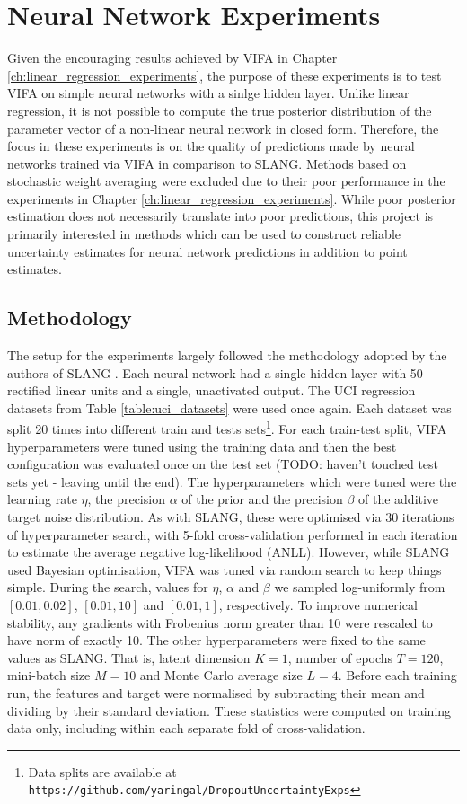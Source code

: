 \documentclass[msc,deptreport.inf]{infthesis} %
\begin{document}
\chapter{Neural Network Experiments}

Given the encouraging results achieved by VIFA in Chapter \ref{ch:linear_regression_experiments}, the purpose of these experiments is to test VIFA on simple neural networks with a sinlge hidden layer. Unlike linear regression, it is not possible to compute the true posterior distribution of the parameter vector of a non-linear neural network in closed form. Therefore, the focus in these experiments is on the quality of predictions made by neural networks trained via VIFA in comparison to SLANG. Methods based on stochastic weight averaging were excluded due to their poor performance in the experiments in Chapter \ref{ch:linear_regression_experiments}. While poor posterior estimation does not necessarily translate into poor predictions, this project is primarily interested in methods which can be used to construct reliable uncertainty estimates for neural network predictions in addition to point estimates. 

\section{Methodology}

The setup for the experiments largely followed the methodology adopted by the authors of SLANG \cite{mishkin2018}. Each neural network had a single hidden layer with 50 rectified linear units and a single, unactivated output. The UCI regression datasets from Table \ref{table:uci_datasets} were used once again. Each dataset was split 20 times into different train and tests sets\footnote{Data splits are available at \texttt{https://github.com/yaringal/DropoutUncertaintyExps}}. For each train-test split, VIFA hyperparameters were tuned using the training data and then the best configuration was evaluated once on the test set (TODO: haven't touched test sets yet - leaving until the end). The hyperparameters which were tuned were the learning rate $\eta$, the precision $\alpha$ of the prior and the precision $\beta$ of the additive target noise distribution. As with SLANG, these were optimised via 30 iterations of hyperparameter search, with 5-fold cross-validation performed in each iteration to estimate the average negative log-likelihood (ANLL). However, while SLANG used Bayesian optimisation, VIFA was tuned via random search to keep things simple. During the search, values for $\eta$, $\alpha$ and $\beta$ we sampled log-uniformly from $[0.01, 0.02]$, $[0.01, 10]$ and $[0.01, 1]$, respectively. To improve numerical stability, any gradients with Frobenius norm greater than 10 were rescaled to have norm of exactly 10. The other hyperparameters were fixed to the same values as SLANG. That is, latent dimension $K=1$, number of epochs $T=120$, mini-batch size $M=10$ and Monte Carlo average size $L=4$.  Before each training run, the features and target were normalised by subtracting their mean and dividing by their standard deviation. These statistics were computed on training data only, including within each separate fold of cross-validation.  
\end{document}
